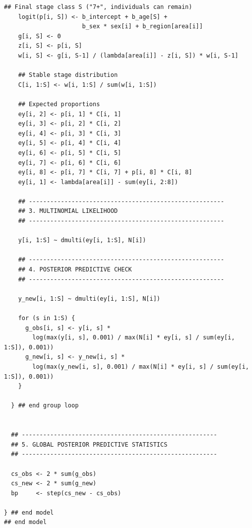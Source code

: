 \documentclass[12pt,a4paper,final,abstract=true,headings=small]{scrartcl}
\begin{document}
\begin{lstlisting}[language=JAGS]
    ## Final stage class S ("7+", individuals can remain)
    logit(p[i, S]) <- b_intercept + b_age[S] +
                      b_sex * sex[i] + b_region[area[i]]
    g[i, S] <- 0
    z[i, S] <- p[i, S]
    w[i, S] <- g[i, S-1] / (lambda[area[i]] - z[i, S]) * w[i, S-1]

    ## Stable stage distribution
    C[i, 1:S] <- w[i, 1:S] / sum(w[i, 1:S])

    ## Expected proportions
    ey[i, 2] <- p[i, 1] * C[i, 1]
    ey[i, 3] <- p[i, 2] * C[i, 2]
    ey[i, 4] <- p[i, 3] * C[i, 3]
    ey[i, 5] <- p[i, 4] * C[i, 4]
    ey[i, 6] <- p[i, 5] * C[i, 5]
    ey[i, 7] <- p[i, 6] * C[i, 6]
    ey[i, 8] <- p[i, 7] * C[i, 7] + p[i, 8] * C[i, 8]
    ey[i, 1] <- lambda[area[i]] - sum(ey[i, 2:8])

    ## -------------------------------------------------------
    ## 3. MULTINOMIAL LIKELIHOOD
    ## -------------------------------------------------------

    y[i, 1:S] ~ dmulti(ey[i, 1:S], N[i])

    ## -------------------------------------------------------
    ## 4. POSTERIOR PREDICTIVE CHECK
    ## -------------------------------------------------------

    y_new[i, 1:S] ~ dmulti(ey[i, 1:S], N[i])

    for (s in 1:S) {
      g_obs[i, s] <- y[i, s] *
        log(max(y[i, s], 0.001) / max(N[i] * ey[i, s] / sum(ey[i, 1:S]), 0.001))
      g_new[i, s] <- y_new[i, s] *
        log(max(y_new[i, s], 0.001) / max(N[i] * ey[i, s] / sum(ey[i, 1:S]), 0.001))
    }

  } ## end group loop


  ## -------------------------------------------------------
  ## 5. GLOBAL POSTERIOR PREDICTIVE STATISTICS
  ## -------------------------------------------------------

  cs_obs <- 2 * sum(g_obs)
  cs_new <- 2 * sum(g_new)
  bp     <- step(cs_new - cs_obs)

} ## end model
## end model

\end{lstlisting}
\end{document}
